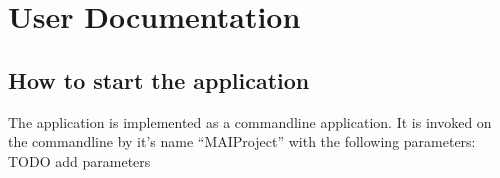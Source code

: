 \appendix
\appendixpage
\addappheadtotoc

\section{User Documentation}\label{sec:userdoc}

\subsection{How to start the application}
The application is implemented as a commandline application. It is invoked on the commandline by it's name "`MAIProject"' with the following parameters:
\\
TODO add parameters
\\
\\

